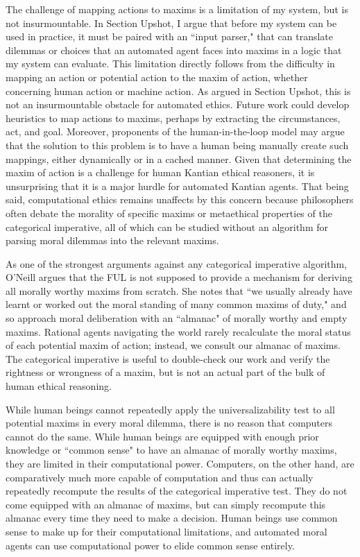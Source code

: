 \begin{isabellebody}
\begin{isamarkuptext}
The challenge of mapping actions to maxims is a limitation of my system, but is not insurmountable. In Section Upshot,
I argue that before my system can be used in practice, it must be paired with an ``input parser," that can
translate dilemmas or choices that an automated agent faces into maxims in a logic that my system can
evaluate. This limitation directly follows from the difficulty in mapping an action or potential action
to the maxim of action, whether concerning human action or machine action. As argued in Section Upshot,  
this is not an insurmountable obstacle for automated ethics. Future work could develop heuristics to 
map actions to maxims, perhaps by extracting the circumstances, act, and goal. Moreover, proponents of the 
human-in-the-loop model may argue that the solution to this problem is to have a human being manually create
such mappings, either dynamically or in a cached manner. Given that determining the maxim of action is a challenge
for human Kantian ethical reasoners, it is unsurprising that it is a major hurdle for automated Kantian agents. 
That being said, computational ethics remains unaffects by this concern because philosophers often debate 
the morality of specific maxims or metaethical properties of the categorical imperative, all of which can
be studied without an algorithm for parsing moral dilemmas into the relevant maxims.

As one of the strongest arguments against any categorical imperative algorithm, O'Neill argues that 
the FUL is not supposed to provide a mechanism for deriving all morally worthy maxims from scratch. She notes
that ``we usually already have learnt or worked out the moral standing of many common maxims of duty," 
and so approach moral deliberation with an ``almanac" of morally worthy and empty maxims. Rational agents
navigating the world rarely recalculate the moral status of each potential maxim of action; instead, we consult our
almanac of maxims. The categorical imperative is useful to double-check our work and verify the rightness or 
wrongness of a maxim, but is not an actual part of the bulk of human ethical reasoning.

While human beings cannot repeatedly apply the universalizability test to all potential maxims in 
every moral dilemma, there is no reason that computers cannot do the same. While human beings are 
equipped with enough prior knowledge or ``common sense" to have an almanac of morally worthy maxims,
they are limited in their computational power. Computers, on the other hand, are comparatively
much more capable of computation and thus can actually repeatedly recompute the results of the categorical
imperative test. They do not come equipped with an almanac of maxims, but can simply recompute this
almanac every time they need to make a decision. Human beings use common sense to make up for their computational
limitations, and automated moral agents can use computational power to elide common sense entirely.


\end{isamarkuptext}
\end{isabellebody}
